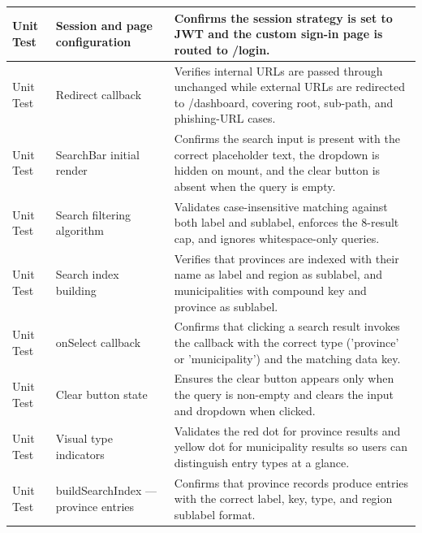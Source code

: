 \documentclass[12pt, letterpaper]{article}
\numberwithin{figure}{section}
\numberwithin{table}{section}
\begin{document}
\begin{center}
\begin{singlespace}
\begin{longtable}{|
        >{\raggedright\arraybackslash}p{}|
        >{\raggedright\arraybackslash}p{}|
      >{\raggedright\arraybackslash}p{}|}
      \rowcolor{white}
      Unit Test & Session and page configuration & Confirms the
      session strategy is set to JWT and the custom sign-in page is
      routed to /login. \\ \hline

      \rowcolor{white}
      Unit Test & Redirect callback & Verifies internal URLs are
      passed through unchanged while external URLs are redirected to
      /dashboard, covering root, sub-path, and phishing-URL cases. \\ \hline

      \rowcolor{white}
      Unit Test & SearchBar initial render & Confirms the search
      input is present with the correct placeholder text, the
      dropdown is hidden on mount, and the clear button is absent
      when the query is empty. \\ \hline

      \rowcolor{white}
      Unit Test & Search filtering algorithm & Validates
      case-insensitive matching against both label and sublabel,
      enforces the 8-result cap, and ignores whitespace-only queries. \\ \hline

      \rowcolor{white}
      Unit Test & Search index building & Verifies that provinces are
      indexed with their name as label and region as sublabel, and
      municipalities with compound key and province as sublabel. \\ \hline

      \rowcolor{white}
      Unit Test & onSelect callback & Confirms that clicking a search
      result invokes the callback with the correct type ('province'
      or 'municipality') and the matching data key. \\ \hline

      \rowcolor{white}
      Unit Test & Clear button state & Ensures the clear button
      appears only when the query is non-empty and clears the input
      and dropdown when clicked. \\ \hline

      \rowcolor{white}
      Unit Test & Visual type indicators & Validates the red dot for
      province results and yellow dot for municipality results so
      users can distinguish entry types at a glance. \\ \hline

      \rowcolor{white}
      Unit Test & buildSearchIndex — province entries & Confirms that
      province records produce entries with the correct label, key,
      type, and region sublabel format. \\ \hline


\end{longtable}
\end{singlespace}
\end{center}
\end{document}

